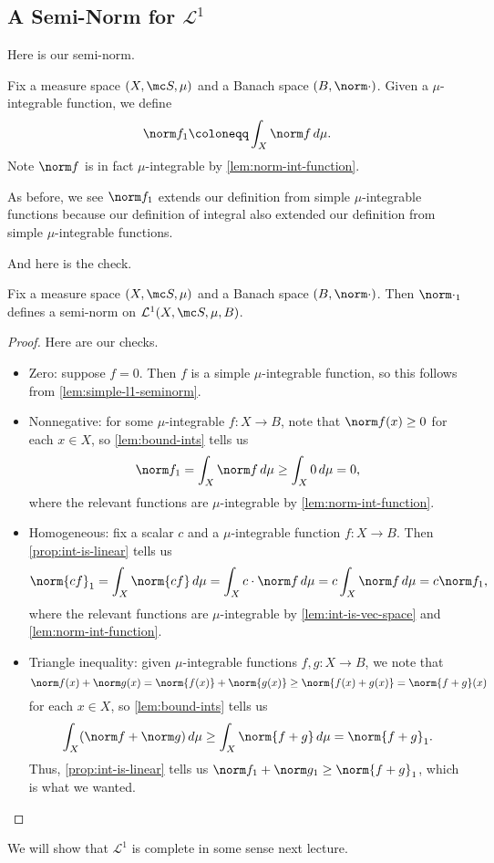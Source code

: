 \documentclass[../notes.tex]{subfiles}
\begin{document}
\subsection{A Semi-Norm for \texorpdfstring{$\mathcal L^1$}{ L1}}
Here is our semi-norm.
\begin{notation}
	Fix a measure space $(X,\mc S,\mu)$ and a Banach space $(B,\norm\cdot)$. Given a $\mu$-integrable function, we define
	\[\norm f_1\coloneqq\int_X\norm f\,d\mu.\]
	Note $\norm f$ is in fact $\mu$-integrable by \autoref{lem:norm-int-function}.
\end{notation}
\begin{remark}
	As before, we see $\norm f_1$ extends our definition from simple $\mu$-integrable functions because our definition of integral also extended our definition from simple $\mu$-integrable functions.
\end{remark}
And here is the check.
\begin{corollary}
	Fix a measure space $(X,\mc S,\mu)$ and a Banach space $(B,\norm\cdot)$. Then $\norm\cdot_1$ defines a semi-norm on $\mathcal L^1(X,\mc S,\mu,B)$.
\end{corollary}
\begin{proof}
	Here are our checks.
	\begin{itemize}
		\item Zero: suppose $f=0$. Then $f$ is a simple $\mu$-integrable function, so this follows from \autoref{lem:simple-l1-seminorm}.
		\item Nonnegative: for some $\mu$-integrable $f\colon X\to B$, note that $\norm f(x)\ge0$ for each $x\in X$, so \autoref{lem:bound-ints} tells us
		\[\norm f_1=\int_X\norm f\,d\mu\ge\int_X0\,d\mu=0,\]
		where the relevant functions are $\mu$-integrable by \autoref{lem:norm-int-function}.
		\item Homogeneous: fix a scalar $c$ and a $\mu$-integrable function $f\colon X\to B$. Then \autoref{prop:int-is-linear} tells us
		\[\norm{cf}_1=\int_X\norm{cf}\,d\mu=\int_Xc\cdot\norm f\,d\mu=c\int_X\norm f\,d\mu=c\norm f_1,\]
		where the relevant functions are $\mu$-integrable by \autoref{lem:int-is-vec-space} and \autoref{lem:norm-int-function}.
		\item Triangle inequality: given $\mu$-integrable functions $f,g\colon X\to B$, we note that
		\[\norm f(x)+\norm g(x)=\norm{f(x)}+\norm{g(x)}\ge\norm{f(x)+g(x)}=\norm{f+g}(x)\]
		for each $x\in X$, so \autoref{lem:bound-ints} tells us
		\[\int_X(\norm f+\norm g)\,d\mu\ge\int_X\norm{f+g}\,d\mu=\norm{f+g}_1.\]
		Thus, \autoref{prop:int-is-linear} tells us $\norm f_1+\norm g_1\ge\norm{f+g}_1$, which is what we wanted.
		\qedhere
	\end{itemize}
\end{proof}
We will show that $\mathcal L^1$ is complete in some sense next lecture.
\end{document}
